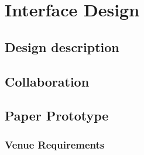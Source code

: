 \chapter{Interface Design}


\section{Design description}


\section{Collaboration}


\section{Paper Prototype}




\subsection{Venue Requirements}


